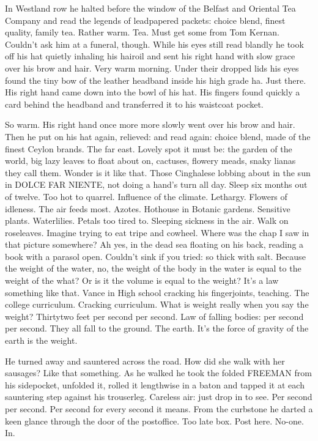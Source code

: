 In Westland row he halted before the window of the Belfast and Oriental
Tea Company and read the legends of leadpapered packets: choice blend,
finest quality, family tea. Rather warm. Tea. Must get some from Tom
Kernan. Couldn't ask him at a funeral, though. While his eyes still read
blandly he took off his hat quietly inhaling his hairoil and sent his
right hand with slow grace over his brow and hair. Very warm morning.
Under their dropped lids his eyes found the tiny bow of the leather
headband inside his high grade ha. Just there. His right hand came down
into the bowl of his hat. His fingers found quickly a card behind the
headband and transferred it to his waistcoat pocket.

So warm. His right hand once more more slowly went over his brow and
hair. Then he put on his hat again, relieved: and read again: choice
blend, made of the finest Ceylon brands. The far east. Lovely spot it
must be: the garden of the world, big lazy leaves to float about on,
cactuses, flowery meads, snaky lianas they call them. Wonder is it like
that. Those Cinghalese lobbing about in the sun in DOLCE FAR NIENTE, not
doing a hand's turn all day. Sleep six months out of twelve. Too hot to
quarrel. Influence of the climate. Lethargy. Flowers of idleness. The air
feeds most. Azotes. Hothouse in Botanic gardens. Sensitive plants.
Waterlilies. Petals too tired to. Sleeping sickness in the air. Walk on
roseleaves. Imagine trying to eat tripe and cowheel. Where was the chap I
saw in that picture somewhere? Ah yes, in the dead sea floating on his
back, reading a book with a parasol open. Couldn't sink if you tried: so
thick with salt. Because the weight of the water, no, the weight of the
body in the water is equal to the weight of the what? Or is it the volume
is equal to the weight? It's a law something like that. Vance in High
school cracking his fingerjoints, teaching. The college curriculum.
Cracking curriculum. What is weight really when you say the weight?
Thirtytwo feet per second per second. Law of falling bodies: per second
per second. They all fall to the ground. The earth. It's the force of
gravity of the earth is the weight.

He turned away and sauntered across the road. How did she walk with her
sausages? Like that something. As he walked he took the folded FREEMAN
from his sidepocket, unfolded it, rolled it lengthwise in a baton and
tapped it at each sauntering step against his trouserleg. Careless air:
just drop in to see. Per second per second. Per second for every second
it means. From the curbstone he darted a keen glance through the door of
the postoffice. Too late box. Post here. No-one. In.

